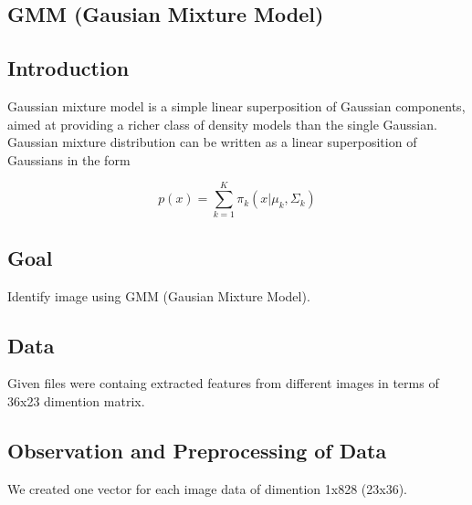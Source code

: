 \begin{center}
\section{GMM (Gausian Mixture Model)}
\end{center}

\subsection{Introduction}
\begin{flushleft}
Gaussian mixture model is a simple linear superposition of Gaussian components, aimed at providing a richer class of density models
than the single Gaussian. Gaussian mixture distribution can be written as a linear superposition of Gaussians in the form

\begin{center}
\begin{equation}
p(x) =  \sum_{k=1}^{K} \pi_{k}(x|\mu_{k}, \Sigma_{k})
\end{equation}
\end{center}

\end{flushleft}


\subsection{Goal}
\begin{flushleft}
    Identify image using GMM (Gausian Mixture Model).
\end{flushleft}

\subsection{Data}
\begin{flushleft}
    Given files were containg extracted features from different images in terms of 36x23 dimention matrix.
\end{flushleft}

\subsection{Observation and Preprocessing of Data}
\begin{flushleft}
  We created one vector for each image data of dimention 1x828 (23x36).
\end{flushleft}

